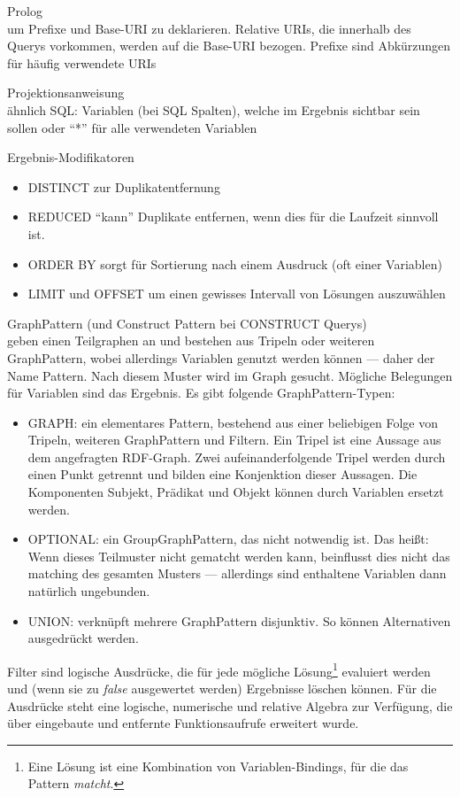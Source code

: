 \begin{itemize}
	\item{Prolog\\um Prefixe und Base-URI zu deklarieren. 
	Relative URIs, die innerhalb des Querys vorkommen, werden auf die Base-URI bezogen. 
	Prefixe sind Abkürzungen für häufig verwendete URIs} 
	\item{Projektionsanweisung\\ähnlich SQL: Variablen (bei SQL Spalten), welche im Ergebnis sichtbar sein sollen oder "`*"' für alle verwendeten Variablen}
	\item{Ergebnis-Modifikatoren
	\begin{itemize}
		\item{DISTINCT zur Duplikatentfernung} 
		\item{REDUCED "`kann"' Duplikate entfernen, wenn dies für die Laufzeit sinnvoll ist.}
		\item{ORDER BY sorgt für Sortierung nach einem Ausdruck (oft einer Variablen)}
		\item{LIMIT und OFFSET um einen gewisses Intervall von Lösungen auszuwählen}
	\end{itemize}
	}
	\item{GraphPattern (und Construct Pattern bei CONSTRUCT Querys)\\
	geben einen Teilgraphen an und bestehen aus Tripeln oder weiteren GraphPattern, wobei allerdings Variablen genutzt werden können --- daher der Name Pattern. 
	Nach diesem Muster wird im Graph gesucht. 
	Mögliche Belegungen für Variablen sind das Ergebnis.
	Es gibt folgende GraphPattern-Typen:
	\begin{itemize}
		\item{GRAPH: ein elementares Pattern, bestehend aus einer beliebigen Folge von Tripeln, weiteren GraphPattern und Filtern. Ein Tripel ist eine Aussage aus dem angefragten RDF-Graph. Zwei aufeinanderfolgende Tripel werden durch einen Punkt getrennt und bilden eine Konjenktion dieser Aussagen. 
		Die Komponenten Subjekt, Prädikat und Objekt können durch Variablen ersetzt werden.}
		\item{OPTIONAL: ein GroupGraphPattern, das nicht notwendig ist. 
		Das heißt: Wenn dieses Teilmuster nicht gematcht werden kann, beinflusst dies nicht das matching des gesamten Musters --- allerdings sind enthaltene Variablen dann natürlich ungebunden.} 
		\item{UNION: verknüpft mehrere GraphPattern disjunktiv. 
		So können Alternativen ausgedrückt werden.}
	\end{itemize}
	\item{Filter sind logische Ausdrücke, die für jede mögliche Lösung\footnote{Eine Lösung ist eine Kombination von Variablen-Bindings, für die das Pattern \emph{matcht}.} evaluiert werden und (wenn sie zu \emph{false} ausgewertet werden) Ergebnisse löschen können. 
	Für die Ausdrücke steht eine logische, numerische und relative Algebra zur Verfügung, die über eingebaute und entfernte Funktionsaufrufe erweitert wurde.
	}
	}
\end{itemize}
